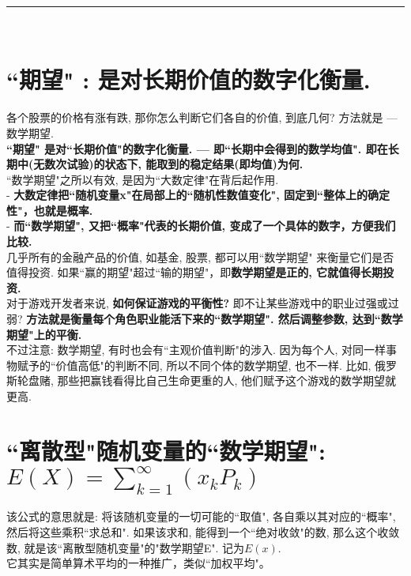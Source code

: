\documentclass[UTF8]{ctexart}
\begin{document}
	
	
	
	~\\
	\hrule
	~\\
	
	\section{``期望" : 是对长期价值的数字化衡量.}
	
	各个股票的价格有涨有跌, 那你怎么判断它们各自的价值, 到底几何? 方法就是 --- 数学期望.  \\
	\textbf{``期望" 是对``长期价值"的数字化衡量. --- 即``长期中会得到的数学均值". 即在长期中(无数次试验)的状态下, 能取到的稳定结果(即均值)为何.} \\
	
	
	``数学期望"之所以有效, 是因为``大数定律"在背后起作用. \\
	- \textbf{大数定律把``随机变量x"在局部上的``随机性数值变化", 固定到``整体上的确定性"，也就是概率.} \\
	- \textbf{而``数学期望", 又把``概率"代表的长期价值, 变成了一个具体的数字，方便我们比较.} \\
	
	几乎所有的金融产品的价值, 如基金, 股票, 都可以用``数学期望" 来衡量它们是否值得投资. 如果``赢的期望"超过``输的期望"，即\textbf{数学期望是正的, 它就值得长期投资.} \\	
	对于游戏开发者来说, \textbf{如何保证游戏的平衡性?} 即不让某些游戏中的职业过强或过弱? \textbf{方法就是衡量每个角色职业能活下来的``数学期望". 然后调整参数, 达到``数学期望"上的平衡.} \\
	
	
	不过注意: 数学期望, 有时也会有``主观价值判断"的涉入. 因为每个人, 对同一样事物赋予的``价值高低"的判断不同, 所以不同个体的数学期望, 也不一样. 比如, 俄罗斯轮盘赌, 那些把赢钱看得比自己生命更重的人, 他们赋予这个游戏的数学期望就更高. 
	
	
	
	
	
	\section{``离散型"随机变量的``数学期望": $E(X)= \sum_{k=1}^{\infty} (x_k P_k)$}
	
	该公式的意思就是: 将该随机变量的一切可能的``取值", 各自乘以其对应的``概率", 然后将这些乘积``求总和". 如果该求和, 能得到一个``绝对收敛"的数, 那么这个收敛数, 就是该``离散型随机变量"的"数学期望E". 记为$E(x)$. \\
	它其实是简单算术平均的一种推广，类似``加权平均"。\\
	
\end{document}
